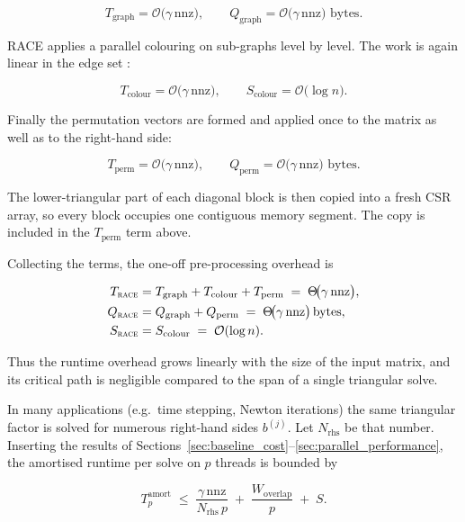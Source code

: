 $$
  T_{\text{graph}}
  = \mathcal{O}\!\bigl(\gamma\,\mathrm{nnz}\bigr),\qquad
  Q_{\text{graph}}
  = \mathcal{O}\!\bigl(\gamma\,\mathrm{nnz}\bigr)\text{ bytes}.
$$

RACE applies a parallel colouring on sub-graphs
level by level.  
The work is again linear in the edge set
\cite{10.1145/3399732}:

$$
   T_{\text{colour}}
  = \mathcal{O}\!\bigl(\gamma\,\mathrm{nnz}\bigr),\qquad
  S_{\text{colour}}
  = \mathcal{O}\!\bigl(\log n\bigr).
$$

Finally the permutation vectors are formed and applied once to the
matrix as well as to the right-hand side:

$$
  T_{\text{perm}}
  = \mathcal{O}\!\bigl(\gamma\,\mathrm{nnz}\bigr),\qquad
  Q_{\text{perm}}
  = \mathcal{O}\!\bigl(\gamma\,\mathrm{nnz}\bigr)\text{ bytes}.
$$

The lower-triangular part of each diagonal block is then copied into a fresh CSR array, so every block occupies one contiguous memory segment. The copy is
included in the \(T_{\text{perm}}\) term above.

Collecting the terms, the one-off pre-processing overhead is

\begin{align}
  T_{\textsc{race}}
  &= 
  T_{\text{graph}} + T_{\text{colour}} + T_{\text{perm}}
     \;=\;
     \Theta\!\bigl(\gamma\,\mathrm{nnz}\bigr),\\
  Q_{\textsc{race}}
  &= 
  Q_{\text{graph}} + Q_{\text{perm}}
     \;=\;
     \Theta\!\bigl(\gamma\,\mathrm{nnz}\bigr)\,\text{bytes},\\
  S_{\textsc{race}}
  &= 
  S_{\text{colour}}
     \;=\;
     \mathcal{O}(\log n).
\end{align}

Thus the runtime overhead grows linearly with the size of the
input matrix, and its critical path is negligible compared to the span
of a single triangular solve.

In many applications (e.g.\ time stepping, Newton iterations) the same
triangular factor is solved for numerous right-hand sides $b^{(j)}$.
Let $N_{\text{rhs}}$ be that number.  
Inserting the results of
Sections~\ref{sec:baseline_cost}--\ref{sec:parallel_performance},
the amortised runtime per solve on $p$ threads is bounded by  

$$
  T^{\text{amort}}_p
  \;\le\;
  \frac{\gamma\,\mathrm{nnz}}{N_{\text{rhs}}\,p}
  \;+\;
  \frac{W_{\text{overlap}}}{p}
  \;+\;
  S
  .
$$

